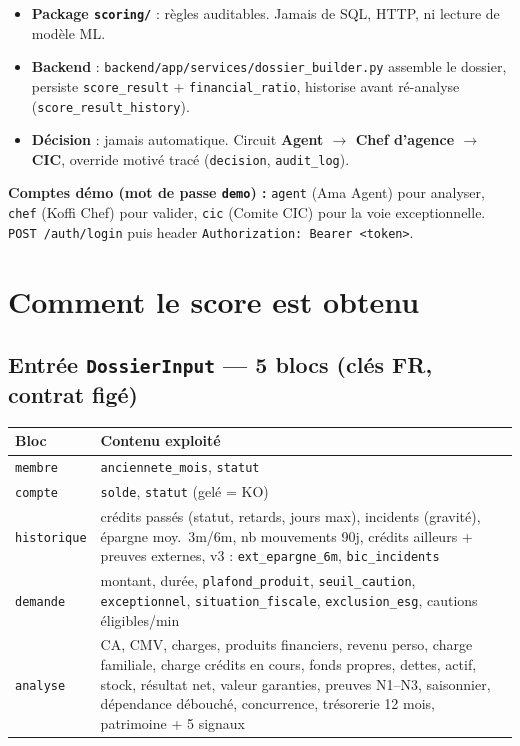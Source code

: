 \documentclass[11pt,a4paper]{article}
\newcommand{\C}[1]{{\small\texttt{\nolinkurl{#1}}}}
\begin{document}
\begin{itemize}
  \item \textbf{Package \C{scoring/}} : règles auditables. Jamais de SQL, HTTP, ni lecture de modèle ML.
  \item \textbf{Backend} : \C{backend/app/services/dossier_builder.py} assemble le dossier, persiste \C{score_result} + \C{financial_ratio}, historise avant ré-analyse (\C{score_result_history}).
  \item \textbf{Décision} : jamais automatique. Circuit \textbf{Agent $\rightarrow$ Chef d'agence $\rightarrow$ CIC}, override motivé tracé (\C{decision}, \C{audit_log}).
\end{itemize}

\begin{encadrevert}
\textbf{Comptes démo (mot de passe \texttt{demo}) :} \texttt{agent} (Ama Agent) pour analyser, \texttt{chef} (Koffi Chef) pour valider, \texttt{cic} (Comite CIC) pour la voie exceptionnelle. \texttt{POST /auth/login} puis header \texttt{Authorization: Bearer <token>}.
\end{encadrevert}

\section{Comment le score est obtenu}

\subsection{Entrée \texttt{DossierInput} --- 5 blocs (clés FR, contrat figé)}

\begin{center}
\small
\begin{tabularx}{\linewidth}{lX}
\toprule
Bloc & Contenu exploité \\
\midrule
\C{membre} & \C{anciennete_mois}, \C{statut} \\
\C{compte} & \C{solde}, \C{statut} (gelé = KO) \\
\C{historique} & crédits passés (statut, retards, jours max), incidents (gravité), épargne moy.\ 3m/6m, nb mouvements 90j, crédits ailleurs + preuves externes, v3 : \C{ext_epargne_6m}, \C{bic_incidents} \\
\C{demande} & montant, durée, \C{plafond_produit}, \C{seuil_caution}, \C{exceptionnel}, \C{situation_fiscale}, \C{exclusion_esg}, cautions éligibles/min \\
\C{analyse} & CA, CMV, charges, produits financiers, revenu perso, charge familiale, charge crédits en cours, fonds propres, dettes, actif, stock, résultat net, valeur garanties, preuves N1--N3, saisonnier, dépendance débouché, concurrence, trésorerie 12 mois, patrimoine + 5 signaux \\
\bottomrule
\end{tabularx}
\end{center}
\end{document}
